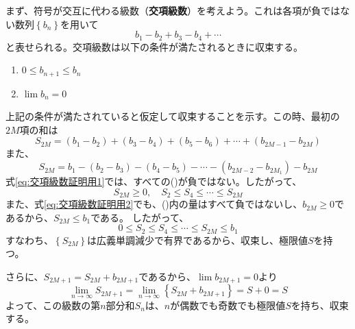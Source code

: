 \documentclass[a4j,dvipdfmx]{jsarticle}
\begin{document}
                まず、符号が交互に代わる級数（\textbf{交項級数}）を考えよう。これは各項が負ではない数列$\left\{b_n\right\}$を用いて
                \begin{equation}
                    b_1-b_2+b_3-b_4+\cdots
                \end{equation}
                と表せられる。交項級数は以下の条件が満たされるときに収束する。
                \begin{enumerate}
                    \item $0\leq b_{n+1}\leq b_n$
                    \item $\lim b_n = 0$
                \end{enumerate}
                上記の条件が満たされていると仮定して収束することを示す。この時、最初の$2M$項の和は
                \begin{equation}
                    S_{2M}=(b_1-b_2)+(b_3-b_4)+(b_5-b_6)+\cdots +(b_{2M-1}-b_{2M})\label{eq:交項級数証明用1}
                \end{equation}
                また、
                \begin{equation}
                    S_{2M}=b_1-(b_2-b_3)-(b_4-b_5)-\cdots - (b_{2M-2}-b_{2M_1})-b_{2M}\label{eq:交項級数証明用2}
                \end{equation}
                式\eqref{eq:交項級数証明用1}では、すべての(\hspace{2mm})が負ではない。したがって、
                \begin{equation}
                    S_{2M}\geq 0,\quad S_2\leq S_4\leq\cdots\leq S_{2M}
                \end{equation}
                また、式\eqref{eq:交項級数証明用2}でも、(\hspace{2mm})内の量はすべて負ではないし、$b_{2M}\geq 0$であるから、$S_{2M}\leq b_1$である。
                したがって、
                \begin{equation}
                    0\leq S_2\leq S_4\leq\cdots\leq S_{2M}\leq b_1
                \end{equation}
                すなわち、$\left\{S_{2M}\right\}$は広義単調減少で有界であるから、収束し、極限値$S$を持つ。

                さらに、$S_{2M+1}=S_{2M}+b_{2M+1}$であるから、$\lim b_{2M+1}=0$より
                \begin{equation*}
                    \lim_{n\to\infty}S_{2M+1}=\lim_{n\to\infty}\left\{S_{2M}+b_{2M+1}\right\}=S+0=S
                \end{equation*}
                よって、この級数の第$n$部分和$S_n$は、$n$が偶数でも奇数でも極限値$S$を持ち、収束する。
\end{document}

